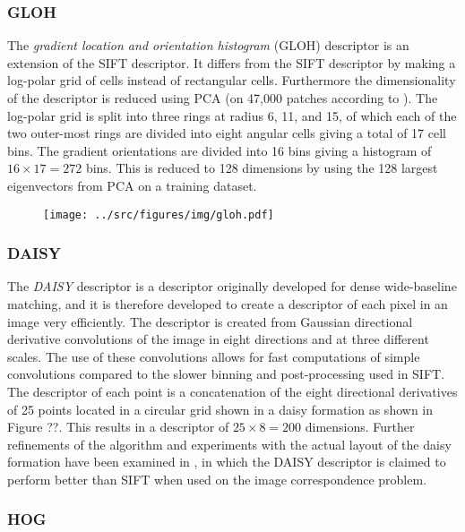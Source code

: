 \documentclass[thesis.tex]{subfiles}
\begin{document}
\subsubsection{GLOH}

The \emph{gradient location and orientation histogram} (GLOH) descriptor
\cite{mikolajczyk2005performance} is an extension of the SIFT descriptor.
It differs from the SIFT descriptor by making a log-polar grid of
cells instead of rectangular cells. Furthermore the dimensionality of
the descriptor is reduced using PCA (on 47,000 patches according to
\cite{mikolajczyk2005performance}). The log-polar grid is split into three
rings at radius 6, 11, and 15, of which each of the two outer-most rings are
divided into eight angular cells giving a total of 17 cell bins. The gradient
orientations are divided into 16 bins giving a histogram of $16 \times 17
= 272$ bins. This is reduced to 128 dimensions by using the 128 largest
eigenvectors from PCA on a training dataset.

\begin{figure}[H]
	\texttt{[image: ../src/figures/img/gloh.pdf]}
\end{figure}

\subsubsection{DAISY}

The \emph{DAISY} descriptor \cite{tola2008fast} is a descriptor originally
developed for dense wide-baseline matching, and it is therefore developed
to create a descriptor of each pixel in an image very efficiently. The
descriptor is created from Gaussian directional derivative convolutions of
the image in eight directions and at three different scales. The use of these
convolutions allows for fast computations of simple convolutions compared
to the slower binning and post-processing used in SIFT. The descriptor of
each point is a concatenation of the eight directional derivatives of 25
points located in a circular grid shown in a daisy formation as shown in
Figure ??. This results in a descriptor of
$25 \times 8 = 200$ dimensions. Further refinements of the algorithm and
experiments with the actual layout of the daisy formation have been examined
in \cite{winder2009picking}, in which the DAISY descriptor is claimed to perform
better than SIFT when used on the image correspondence problem.

\subsubsection{HOG}
\end{document}
